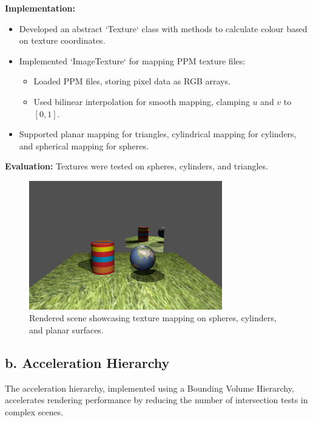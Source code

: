 \documentclass[11pt,a4paper]{article}
\begin{document}
\noindent\textbf{Implementation:}  
\begin{itemize}
    \item Developed an abstract `Texture` class with methods to calculate colour based on texture coordinates.  
    \item Implemented `ImageTexture` for mapping PPM texture files:  
    \begin{itemize}
        \item Loaded PPM files, storing pixel data as RGB arrays.  
        \item Used bilinear interpolation for smooth mapping, clamping \( u \) and \( v \) to \([0, 1]\).  
    \end{itemize}  
    \item Supported planar mapping for triangles, cylindrical mapping for cylinders, and spherical mapping for spheres.  
\end{itemize}

\noindent\textbf{Evaluation:}  
Textures were tested on spheres, cylinders, and triangles.

\begin{figure}[h!]  
    \centering  
    \includegraphics[width=0.75\textwidth]{textures.png}  
    \caption{Rendered scene showcasing texture mapping on spheres, cylinders, and planar surfaces.}  
    \label{fig:textures}  
\end{figure}  

\subsection{b. Acceleration Hierarchy}  
\label{sec:acceleration-hierarchy}
The acceleration hierarchy, implemented using a Bounding Volume Hierarchy, accelerates rendering performance by reducing the number of intersection tests in complex scenes.
\end{document}
